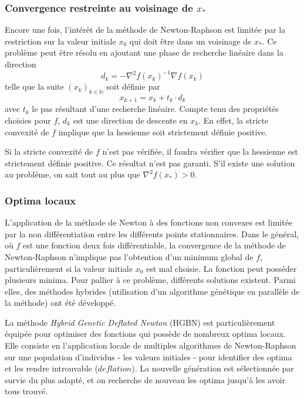 \documentclass[3p, twocolumn]{elsarticle}
\begin{document}
\subsubsection{Convergence restreinte au voisinage de $x_*$}
Encore une fois, l'intérêt de la méthode de Newton-Raphson est limitée par la restriction sur la valeur initiale $x_0$ qui doit être dans un voisinage de $x_*$.
Ce problème peut être résolu en ajoutant une phase de recherche linéaire dans la direction
\begin{equation*}
    d_{k} = -\nabla ^{2}f(x_{k})^{-1} \nabla f(x_{k})
\end{equation*}
telle que la suite $(x_k)_{k\in \mathbb{N}}$ soit définie par
\begin{equation}
    x_{k+1}=x_k+t_k\cdot d_k
    \label{eq:nr-opt-mono}
\end{equation}
avec $t_k$ le pas résultant d'une recherche linéaire.
Compte tenu des propriétés choisies pour $f$, $d_k$ est une direction de descente en $x_k$. En effet, la stricte convexité de $f$ implique que la hessienne soit strictement définie positive.
\begin{rmk}
    Si la stricte convexité de $f$ n'est pas vérifiée, il faudra vérifier que la hessienne est strictement définie positive. Ce résultat n'est pas garanti. S'il existe une solution au problème, on sait tout au plus que $\nabla^2f(x_*)>0$.
\end{rmk}

\subsubsection{Optima locaux}
L'application de la méthode de Newton à des fonctions non convexes est limitée par la non différentiation entre les différents points stationnaires. Dans le général, où $f$ est une fonction deux fois différentiable, la convergence de la méthode de Newton-Raphson n'implique pas l'obtention d'un minimum global de $f$, particulièrement si la valeur initiale $x_0$ est mal choisie. La fonction peut posséder plusieurs minima. Pour pallier à ce problème, différents solutions existent. Parmi elles, des méthodes hybrides (utilisation d'un algorithme génétique en parallèle de la méthode) ont été développé.

La méthode \textit{Hybrid Genetic Deflated Newton} (HGBN) \cite{art:Noack_Funke_2017} est particulièrement équipée pour optimiser des fonctions qui possède de nombreux optima locaux. Elle consiste en l'application locale de multiples algorithmes de Newton-Raphson sur une population d'individus - les valeurs initiales - pour identifier des optima et les rendre introuvable ($deflation$). La nouvelle génération est sélectionnée par survie du plus adapté, et on recherche de nouveau les optima jusqu'à les avoir tous trouvé.
\end{document}
